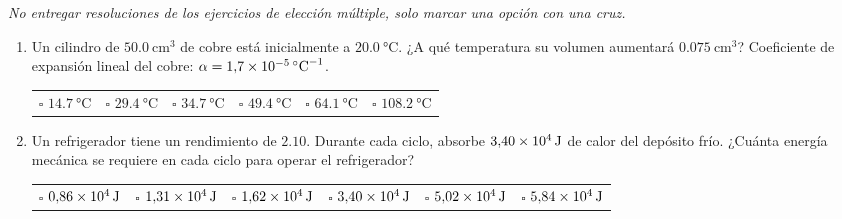 \documentclass[a4paper,11pt,dvipsnames]{article}
\begin{document}


\textit{No entregar resoluciones de los ejercicios de elección múltiple, solo marcar una opción con una cruz.}

\begin{enumerate}[leftmargin=*]
  \item Un cilindro de $\SI{50.0}{\centi\meter^3}$ de cobre está inicialmente a $\SI{20.0}{\celsius}$. ¿A qué temperatura su volumen aumentará $\SI{0.075}{\centi\meter^3}$? Coeficiente de expansión lineal del cobre: $\alpha = \SI{1.7E-5}{\celsius^{-1}}$.\\
  \begin{tabularx}{\textwidth}{XXXXXX}
    $\square$ $\SI{14.7}{\celsius}$ & $\square$ $\SI{29.4}{\celsius}$ & $\square$ $\SI{34.7}{\celsius}$ & $\square$ $\SI{49.4}{\celsius}$ & $\square$ $\SI{64.1}{\celsius}$ & $\square$ $\SI{108.2}{\celsius}$\\
  \end{tabularx}

  
  \item Un refrigerador tiene un rendimiento de $2.10$. Durante cada ciclo, absorbe $\SI{3.40E4}{\joule}$ de calor del depósito frío. ¿Cuánta energía mecánica se requiere en cada ciclo para operar el refrigerador?\\
  \begin{tabularx}{\textwidth}{XXXXXX}
    $\square$ $\SI{0.86E4}{\joule}$ & $\square$ $\SI{1.31E4}{\joule}$ & $\square$ $\SI{1.62E4}{\joule}$ & $\square$ $\SI{3.40E4}{\joule}$ & $\square$ $\SI{5.02E4}{\joule}$ & $\square$ $\SI{5.84E4}{\joule}$\\
  \end{tabularx}
  

\end{enumerate}
\end{document}
